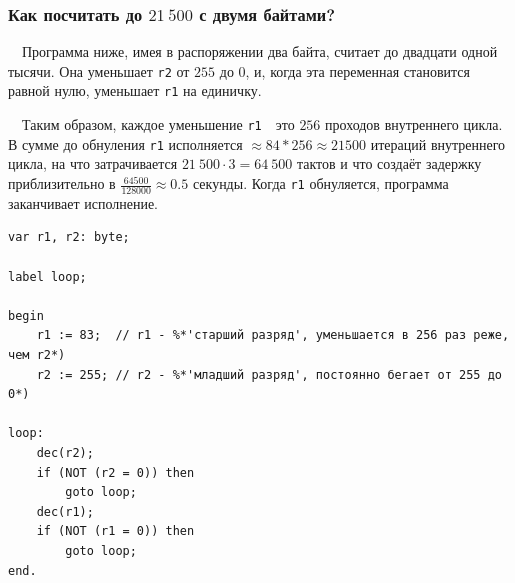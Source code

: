\documentclass[aspectratio=169, pdf, 8pt, unicode]{beamer}
\begin{document}
\begin{frame}[fragile]
\frametitle{Как посчитать до $21\ 500$ с двумя байтами?}
		\ \ Программа ниже, имея в распоряжении два байта, считает до двадцати одной тысячи.
		Она уменьшает \texttt{r2} от $255$ до $0$, и, когда эта переменная становится равной нулю,
		уменьшает \texttt{r1} на единичку.

		\ \ Таким образом, каждое уменьшение \texttt{r1}\ \cyrdash\ это $256$ проходов внутреннего цикла.
		В сумме до обнуления \texttt{r1} исполняется $\approx 84*256 \approx 21 500$ итераций внутреннего цикла,
		на что затрачивается $21\ 500 \cdot 3 = 64\ 500$ тактов и что создаёт задержку приблизительно в
		$\frac{64500}{128000} \approx 0.5$ секунды.
		Когда \texttt{r1} обнуляется, программа заканчивает исполнение.
			\begin{lstlisting}
var r1, r2: byte;

label loop;

begin
    r1 := 83;  // r1 - %*'старший разряд', уменьшается в 256 раз реже, чем r2*)
    r2 := 255; // r2 - %*'младший разряд', постоянно бегает от 255 до 0*)

loop:
    dec(r2);
    if (NOT (r2 = 0)) then
        goto loop;
    dec(r1);
    if (NOT (r1 = 0)) then
        goto loop;
end.
			\end{lstlisting}
\end{frame}
\end{document}
